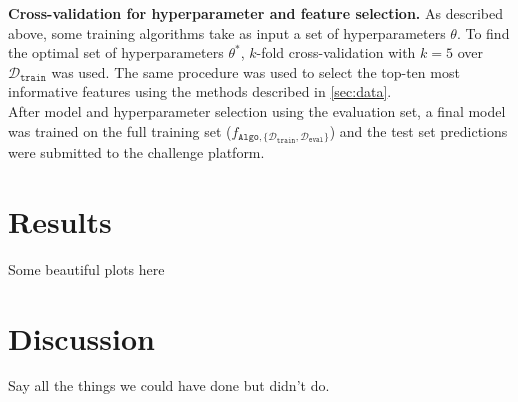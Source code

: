 \documentclass[10pt,conference,compsocconf]{IEEEtran}
\newcommand{\parabf}[1]{\vspace{1mm}\noindent\textbf{#1}}
\newcommand{\Deval}{\mathcal{D}_{\mathtt{eval}}}
\newcommand{\Dtrain}{\mathcal{D}_{\mathtt{train}}}
\newcommand{\classifier}[2]{f_{#1, #2}}
\newcommand{\Train}{\mathtt{Algo}}
\begin{document}
\parabf{Cross-validation for hyperparameter and feature selection.} As described above, some training algorithms take as input a set of hyperparameters $\theta$. To find the optimal set of hyperparameters $\theta^*$, $k$-fold cross-validation with $k=5$ over $\Dtrain$ was used. The same procedure was used to select the top-ten most informative features using the methods described in \autoref{sec:data}.\\
  
After model and hyperparameter selection using the evaluation set, a final model was trained on the full training set
($\classifier{\Train}{\{ \Dtrain, \Deval\}}$) and the test set predictions were submitted to the challenge platform. 

\section{Results}
Some beautiful plots here

\section{Discussion}
Say all the things we could have done but didn't do.



\end{document}
